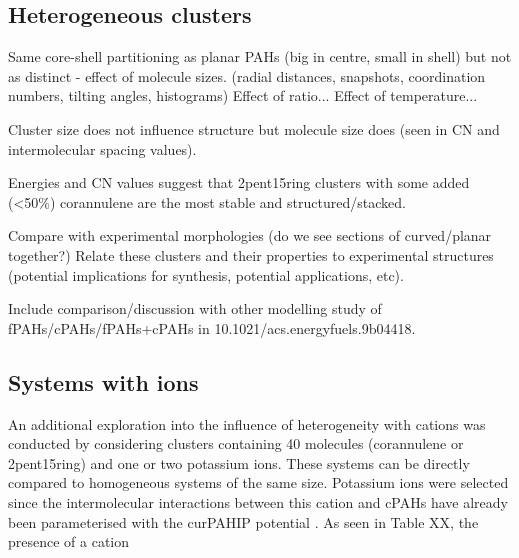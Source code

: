 \subsection{Heterogeneous clusters}
Same core-shell partitioning as planar PAHs (big in centre, small in shell) but not as distinct - effect of molecule sizes. (radial distances, snapshots, coordination numbers, tilting angles, histograms)
Effect of ratio...
Effect of temperature...

Cluster size does not influence structure but molecule size does (seen in CN and intermolecular spacing values).

Energies and CN values suggest that 2pent15ring clusters with some added (<50\%) corannulene are the most stable and structured/stacked.

Compare with experimental morphologies (do we see sections of curved/planar together?)
Relate these clusters and their properties to experimental structures (potential implications for synthesis, potential applications, etc).

Include comparison/discussion with other modelling study of fPAHs/cPAHs/fPAHs+cPAHs in 10.1021/acs.energyfuels.9b04418.


\subsection{Systems with ions}
An additional exploration into the influence of heterogeneity with cations was conducted by considering clusters containing 40 molecules (corannulene or 2pent15ring) and one or two potassium ions.  These systems can be directly compared to homogeneous systems of the same size.  Potassium ions were selected since the intermolecular interactions between this cation and cPAHs have already been parameterised with the curPAHIP potential \cite{bowal2019ion}. As seen in Table XX, the presence of a cation


